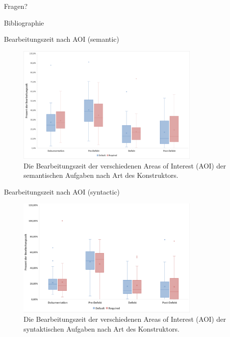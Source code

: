 \documentclass[10pt]{beamer}
\begin{document}
\appendix

	\begin{frame}[standout]
		Fragen?
	\end{frame}

	\begin{frame}[allowframebreaks]{Bibliographie}
		
		
	\end{frame}

	\begin{frame}{Bearbeitungszeit nach AOI (semantic)}
		\begin{figure}
			\includegraphics[width=0.8\textwidth]{graphics/box_time-aoi_sem.png}
			\caption{
				\label{fig:box_time-aoi_sem.png} 
				Die Bearbeitungszeit der verschiedenen Areas of Interest (AOI) der semantischen Aufgaben nach Art des Konstruktors.
			}
		\end{figure}
	\end{frame}

	\begin{frame}{Bearbeitungszeit nach AOI (syntactic)}
		\begin{figure}
			\includegraphics[width=0.8\textwidth]{graphics/box_time-aoi_syn.png}
			\caption{
				\label{fig:box_time-aoi_syn.png} 
				Die Bearbeitungszeit der verschiedenen Areas of Interest (AOI) der syntaktischen Aufgaben nach Art des Konstruktors.
			}
		\end{figure}
	\end{frame}
\end{document}

